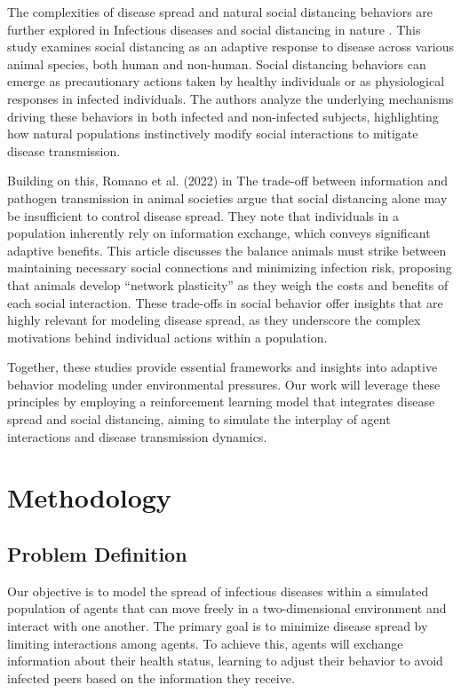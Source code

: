 \documentclass[9pt]{IEEEtran}
\begin{document}
The complexities of disease spread and natural social distancing behaviors are further explored in Infectious diseases and social distancing in nature \cite{stockmaier2021infectious}. This study examines social distancing as an adaptive response to disease across various animal species, both human and non-human. Social distancing behaviors can emerge as precautionary actions taken by healthy individuals or as physiological responses in infected individuals. The authors analyze the underlying mechanisms driving these behaviors in both infected and non-infected subjects, highlighting how natural populations instinctively modify social interactions to mitigate disease transmission.

Building on this, Romano et al. (2022) in The trade-off between information and pathogen transmission in animal societies \cite{romano2022tradeoff} argue that social distancing alone may be insufficient to control disease spread. They note that individuals in a population inherently rely on information exchange, which conveys significant adaptive benefits. This article discusses the balance animals must strike between maintaining necessary social connections and minimizing infection risk, proposing that animals develop “network plasticity” as they weigh the costs and benefits of each social interaction. These trade-offs in social behavior offer insights that are highly relevant for modeling disease spread, as they underscore the complex motivations behind individual actions within a population.

Together, these studies provide essential frameworks and insights into adaptive behavior modeling under environmental pressures. Our work will leverage these principles by employing a reinforcement learning model that integrates disease spread and social distancing, aiming to simulate the interplay of agent interactions and disease transmission dynamics.

\section{Methodology}

\subsection{Problem Definition}

Our objective is to model the spread of infectious diseases within a simulated population of agents that can move freely in a two-dimensional environment and interact with one another. The primary goal is to minimize disease spread by limiting interactions among agents. To achieve this, agents will exchange information about their health status, learning to adjust their behavior to avoid infected peers based on the information they receive.
\end{document}
